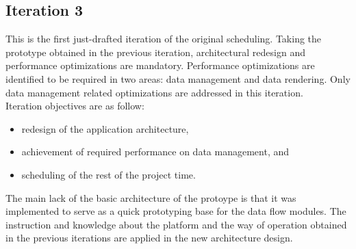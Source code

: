 		\subsection{Iteration 3}

			This is the first just-drafted iteration of the original scheduling. Taking the prototype obtained in the previous iteration, architectural redesign and performance optimizations are mandatory. Performance optimizations are  identified to be required in two areas: data management and data rendering. Only data management related optimizations are addressed in this iteration.\\

			Iteration objectives are as follow:
			\begin{itemize} 
				\item redesign of the application architecture, 
				\item achievement of required performance on data management, and
				\item scheduling of the rest of the project time.
			\end{itemize}

			The main lack of the basic architecture of the protoype is that it was implemented to serve as a quick prototyping base for the data flow modules. The instruction and knowledge about the platform and the way of operation obtained in the previous iterations are applied in the new architecture design.\\

